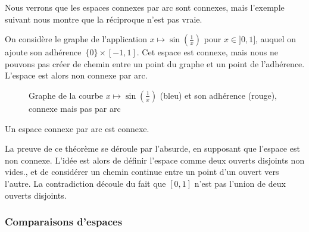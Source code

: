 Nous verrons que les espaces connexes par arc sont connexes, mais l'exemple suivant nous montre que la réciproque n'est pas vraie.

\begin{exemple}
On considère le graphe de l'application $x\mapsto\sin\left(\frac{1}{x}\right)$ pour $x\in]0,1]$, auquel on ajoute son adhérence~$\{0\}\times[-1,1]$. Cet espace est connexe, mais nous ne pouvons pas créer de chemin entre un point du graphe et un point de l'adhérence. L'espace est alors non connexe par arc.
\begin{figure}[h]
    \centering
{}
\label{tkz:non-path-connected}
\caption{Graphe de la courbe $x\mapsto\sin\left(\frac{1}{x}\right)$ (bleu) et son adhérence (rouge), connexe mais pas par arc}
\end{figure}
\end{exemple}


\begin{theorem}
Un espace connexe par arc est connexe.
\end{theorem}
La preuve de ce théorème se déroule par l'absurde, en supposant que l'espace est non connexe. L'idée est alors de définir l'espace comme deux ouverts disjoints non vides., et de considérer un chemin continue entre un point d'un ouvert vers l'autre. La contradiction découle du fait que $[0,1]$ n'est pas l'union de deux ouverts disjoints.

\subsubsection{Comparaisons d'espaces}

